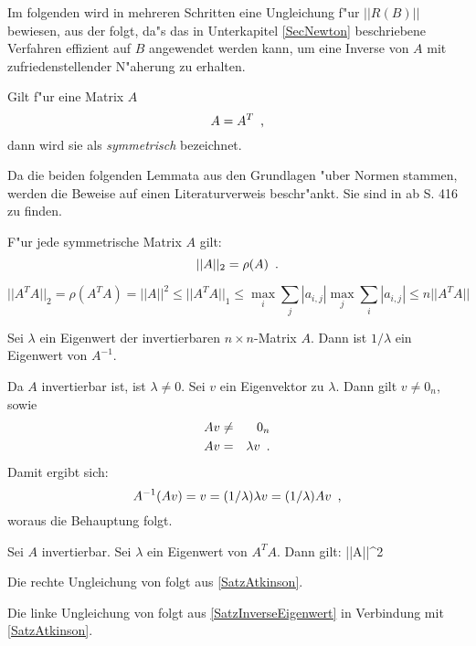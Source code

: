 Im folgenden wird in mehreren Schritten eine Ungleichung f"ur
$||R(B)||$ bewiesen, aus der folgt, da"s das in Unterkapitel \ref{SecNewton}
beschriebene Verfahren effizient auf $B$ angewendet werden kann, um eine
Inverse von $A$ mit zufriedenstellender N"aherung zu erhalten.

\MyBeginDef
\label{DefSymmetrisch}
 
    Gilt f"ur eine Matrix $A$ \[ A = A^T \mbox{\hspace{0.5em},} \] dann wird sie als
    {\em symmetrisch} bezeichnet.
\MyEndDef

Da die beiden folgenden Lemmata aus den Grundlagen "uber Normen stammen,
werden die Beweise auf einen Literaturverweis beschr"ankt. Sie sind
in \cite{Atki78} ab S. 416 zu finden.

\begin{lemma}
\label{SatzSymmetrischSpektral}
    F"ur jede symmetrische Matrix $A$ gilt:
    \[ ||A||_2 = \rho(A) \mbox{\hspace{0.5em}.} \]
\end{lemma}
            
\begin{lemma}
\label{SatzAtkinson}
\[
    ||A^T A||_2 = \rho(A^T A) = ||A||^2 \leq 
    ||A^T A||_1 \leq \max_i \sum_j |a_{i,j}| \max_j \sum_i |a_{i,j}| 
    \leq n ||A^T A||
\]
\end{lemma}

\begin{lemma}
\label{SatzInverseEigenwert}
    Sei $\lambda$ ein Eigenwert der invertierbaren $n \times n$-Matrix $A$. 
    Dann ist $1/\lambda$ ein Eigenwert von $A^{-1}$.
\end{lemma}
\begin{beweis}
    Da $A$ invertierbar ist, ist $\lambda \neq 0$. Sei $v$ ein Eigenvektor
    zu $\lambda$. Dann gilt $v \neq 0_n$, sowie
    \begin{eqnarray*}
        Av & \neq & 0_n \\
        Av & = & \lambda v \mbox{\hspace{0.5em}.}
    \end{eqnarray*}
    Damit ergibt sich:
    \[ A^{-1}(Av) = v = (1/\lambda) \lambda v = (1/\lambda) A v \mbox{\hspace{0.5em},}\]
    woraus die Behauptung folgt.
\end{beweis}

\begin{lemma}
\label{SatzEigenUngleichung}
    Sei $A$ invertierbar. Sei $\lambda$ ein Eigenwert von $A^T A$.
    Dann gilt:
             \leq \lambda \leq ||A||^2
             \MyPunkt
    \Eeq
\end{lemma}
\begin{beweis}
    Die rechte Ungleichung von  folgt aus
    \ref{SatzAtkinson}.
    
    Die linke Ungleichung von  folgt aus
    \ref{SatzInverseEigenwert} in Verbindung mit \ref{SatzAtkinson}.
\end{beweis}

